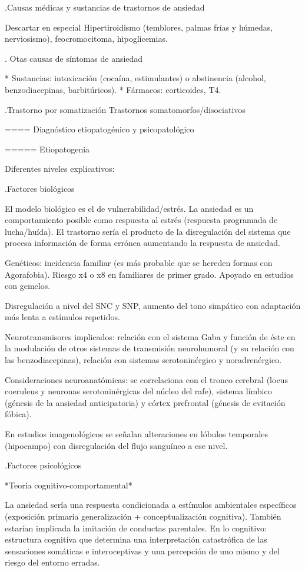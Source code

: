 \documentclass{scrbook}
\begin{document}
.Causas médicas y sustancias de trastornos de ansiedad

Descartar en especial Hipertiroidismo (temblores, palmas frías y húmedas, nerviosismo), feocromocitoma, hipoglicemias.

. Otas causas de síntomas de ansiedad

* Sustancias: intoxicación (cocaína, estimulantes) o abstinencia (alcohol, benzodiacepinas, barbitúricos).
* Fármacos: corticoides, T4.

.Trastorno por somatización
Trastornos somatomorfos/disociativos

==== Diagnóstico etiopatogénico y psicopatológico

===== Etiopatogenia

Diferentes niveles explicativos:

.Factores biológicos

El modelo biológico es el de vulnerabilidad/estrés. La ansiedad es un comportamiento posible como respuesta al estrés (respuesta programada de lucha/huída). El trastorno sería el producto de la disregulación del sistema que procesa información de forma errónea aumentando la respuesta de ansiedad.

Genéticos: incidencia familiar (es más probable que se hereden formas con Agorafobia). Riesgo x4 o x8 en familiares de primer grado. Apoyado en estudios con gemelos.

Disregulación a nivel del SNC y SNP, aumento del tono simpático con adaptación más lenta a estímulos repetidos.

Neurotransmisores implicados: relación con el sistema Gaba y función de éste en la modulación de otros sistemas de transmisión neurohumoral (y su relación con las benzodiacepinas), relación con sistemas serotoninérgico y noradrenérgico.

Consideraciones neuroanatómicas: se correlaciona con el tronco cerebral (locus coeruleus y neuronas serotoninérgicas del núcleo del rafe), sistema límbico (génesis de la ansiedad anticipatoria) y córtex prefrontal (génesis de evitación fóbica).

En estudios imagenológicos se señalan alteraciones en lóbulos temporales (hipocampo) con disregulación del flujo sanguíneo a ese nivel.

.Factores psicológicos

*Teoría cognitivo-comportamental*

La ansiedad sería una respuesta condicionada a estímulos ambientales específicos (exposición primaria generalización + conceptualización cognitiva). También estarían implicada la imitación de conductas parentales.
En lo cognitivo: estructura cognitiva que determina una interpretación catastrófica de las sensaciones somáticas e interoceptivas y una percepción de uno mismo y del riesgo del entorno erradas.
\end{document}
